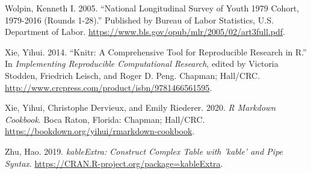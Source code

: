 \documentclass[12pt]{article}
\newlength{\cslhangindent}
\newlength{\cslentryspacingunit} %
\newenvironment{CSLReferences}[2] %
 {%
  \setlength{\parindent}{0pt}
  \ifodd #1
  \let\oldpar\par
  \def\par{\hangindent=\cslhangindent\oldpar}
  \fi
  \setlength{\parskip}{#2\cslentryspacingunit}
 }%
 {}
\begin{document}
\begin{CSLReferences}{1}{0}
\leavevmode{}%
Wolpin, Kenneth I. 2005. {``National Longitudinal Survey of Youth 1979 Cohort, 1979-2016 (Rounds 1-28).''} Published by Bureau of Labor Statistics, U.S. Department of Labor. \url{https://www.bls.gov/opub/mlr/2005/02/art3full.pdf}.

\leavevmode{}%
Xie, Yihui. 2014. {``Knitr: A Comprehensive Tool for Reproducible Research in {R}.''} In \emph{Implementing Reproducible Computational Research}, edited by Victoria Stodden, Friedrich Leisch, and Roger D. Peng. Chapman; Hall/CRC. \url{http://www.crcpress.com/product/isbn/9781466561595}.

\leavevmode{}%
Xie, Yihui, Christophe Dervieux, and Emily Riederer. 2020. \emph{R Markdown Cookbook}. Boca Raton, Florida: Chapman; Hall/CRC. \url{https://bookdown.org/yihui/rmarkdown-cookbook}.

\leavevmode{}%
Zhu, Hao. 2019. \emph{{kableExtra: Construct Complex Table with 'kable' and Pipe Syntax}}. \url{https://CRAN.R-project.org/package=kableExtra}.

\end{CSLReferences}



\end{document}

